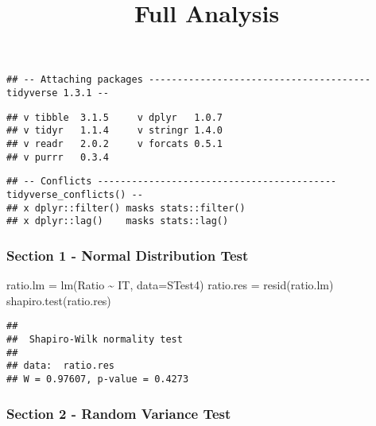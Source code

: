 \documentclass[
]{article}
\title{Full Analysis}
\author{}
\date{\vspace{-2.5em}}
\newenvironment{Shaded}{\begin{snugshade}}{\end{snugshade}}
\newcommand{\AttributeTok}[1]{\textcolor[rgb]{0.77,0.63,0.00}{#1}}
\newcommand{\DecValTok}[1]{\textcolor[rgb]{0.00,0.00,0.81}{#1}}
\newcommand{\FunctionTok}[1]{\textcolor[rgb]{0.00,0.00,0.00}{#1}}
\newcommand{\NormalTok}[1]{#1}
\newcommand{\OtherTok}[1]{\textcolor[rgb]{0.56,0.35,0.01}{#1}}
\newcommand{\SpecialCharTok}[1]{\textcolor[rgb]{0.00,0.00,0.00}{#1}}
\newcommand{\StringTok}[1]{\textcolor[rgb]{0.31,0.60,0.02}{#1}}
\begin{document}
\maketitle

\begin{verbatim}
## -- Attaching packages --------------------------------------- tidyverse 1.3.1 --
\end{verbatim}

\begin{verbatim}
## v tibble  3.1.5     v dplyr   1.0.7
## v tidyr   1.1.4     v stringr 1.4.0
## v readr   2.0.2     v forcats 0.5.1
## v purrr   0.3.4
\end{verbatim}

\begin{verbatim}
## -- Conflicts ------------------------------------------ tidyverse_conflicts() --
## x dplyr::filter() masks stats::filter()
## x dplyr::lag()    masks stats::lag()
\end{verbatim}

\hypertarget{section-1---normal-distribution-test}{%
\subsubsection{Section 1 - Normal Distribution
Test}\label{section-1---normal-distribution-test}}

\begin{Shaded}
\begin{Highlighting}[]
\NormalTok{ratio.lm }\OtherTok{=} \FunctionTok{lm}\NormalTok{(Ratio }\SpecialCharTok{\textasciitilde{}}\NormalTok{ IT, }\AttributeTok{data=}\NormalTok{STest4)}
\NormalTok{ratio.res }\OtherTok{=} \FunctionTok{resid}\NormalTok{(ratio.lm)}
\FunctionTok{shapiro.test}\NormalTok{(ratio.res)}
\end{Highlighting}
\end{Shaded}

\begin{verbatim}
## 
##  Shapiro-Wilk normality test
## 
## data:  ratio.res
## W = 0.97607, p-value = 0.4273
\end{verbatim}

\hypertarget{section-2---random-variance-test}{%
\subsubsection{Section 2 - Random Variance
Test}\label{section-2---random-variance-test}}

\begin{Shaded}
\end{Shaded}
\end{document}
